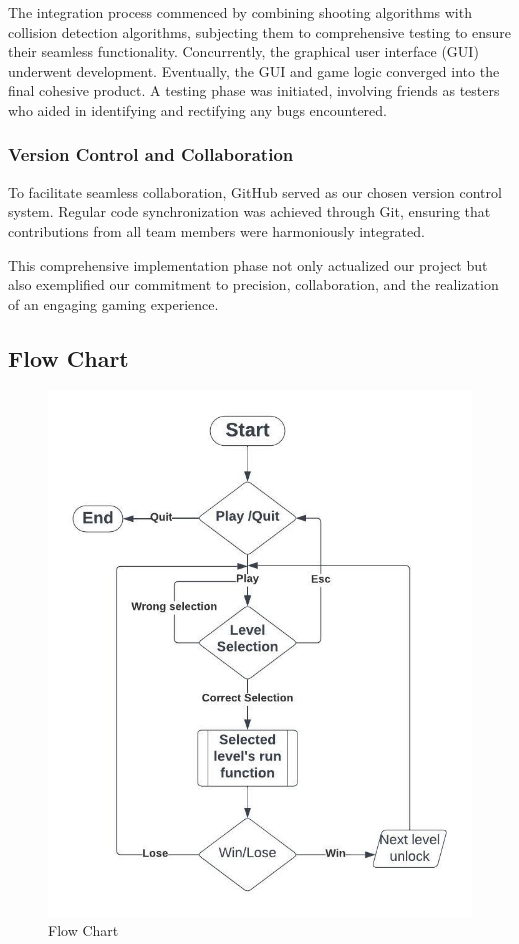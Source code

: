 	 		The integration process commenced by combining shooting algorithms with collision detection algorithms, subjecting them to comprehensive testing to ensure their seamless functionality. Concurrently, the graphical user interface (GUI) underwent development. Eventually, the GUI and game logic converged into the final cohesive product. A testing phase was initiated, involving friends as testers who aided in identifying and rectifying any bugs encountered.
	 		
	 \subsubsection{ Version Control and Collaboration}
	 
	 		To facilitate seamless collaboration, GitHub served as our chosen version control system. Regular code synchronization was achieved through Git, ensuring that contributions from all team members were harmoniously integrated.
	 		


This comprehensive implementation phase not only actualized our project but also exemplified our commitment to precision, collaboration, and the realization of an engaging gaming experience.

\newpage
\subsection{Flow Chart}

\vspace{2cm}
\begin{figure}[h]
	
	\centering
	\includegraphics{sec/pdf/flowchart}
	\caption{Flow Chart}
\end{figure}

